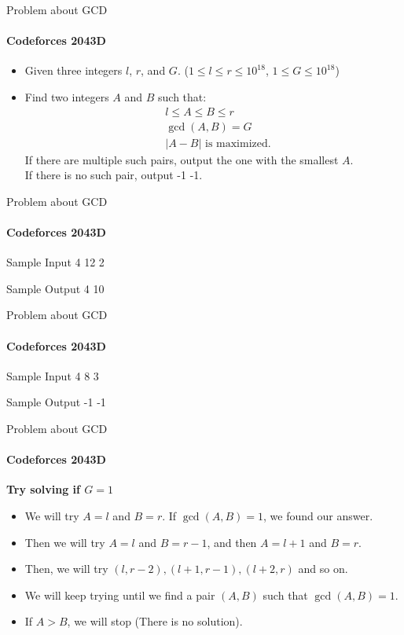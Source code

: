 \begin{frame}{Problem about GCD}
	\framesubtitle{Codeforces 2043D}
	\begin{itemize}
        \item <1-> Given three integers $l$, $r$, and $G$. ($1 \leq l \leq r \leq 10^{18}$, $1 \leq G \leq 10^{18}$)
		\item <2-> Find two integers $A$ and $B$ such that:
		      \begin{align*}
			       & l \leq A \leq B \leq r         \\
			       & \gcd(A, B) = G                 \\
			       & | A - B| \text{ is maximized.}
		      \end{align*}
		      If there are multiple such pairs, output the one with the smallest $A$. \\
		      If there is no such pair, output -1 -1.
	\end{itemize}
\end{frame}

\begin{frame}{Problem about GCD}
	\framesubtitle{Codeforces 2043D}
	\begin{block}{Sample Input}
		4 12 2
	\end{block}
	\begin{block}{Sample Output}
		4 10
	\end{block}
\end{frame}

\begin{frame}{Problem about GCD}
	\framesubtitle{Codeforces 2043D}
	\begin{block}{Sample Input}
		4 8 3
	\end{block}
	\begin{block}{Sample Output}
		-1 -1
	\end{block}
\end{frame}

\begin{frame}{Problem about GCD}
	\framesubtitle{Codeforces 2043D}
	\textbf{Try solving if $G = 1$} \\
	\begin{itemize}
		\item <1-> We will try $A = l$ and $B = r$. If $\gcd(A, B) = 1$, we found our answer.
		\item <2-> Then we will try $A = l$ and $B = r - 1$, and then $A = l + 1$ and $B = r$.
		\item <3-> Then, we will try $(l, r - 2), (l + 1, r - 1), (l + 2, r)$ and so on.
		\item <4-> We will keep trying until we find a pair $(A, B)$ such that $\gcd(A, B) = 1$.
		\item <5-> If $A > B$, we will stop (There is no solution).
	\end{itemize}
\end{frame}

